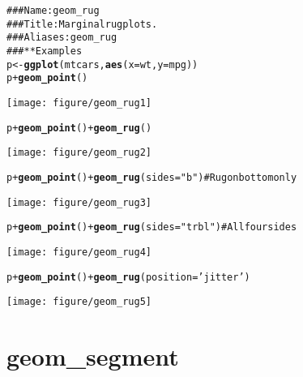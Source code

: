 \documentclass[a4paper,titlepage]{tufte-handout}\usepackage{graphicx, color}
\makeatletter
\def\maxwidth{ %
  \ifdim\Gin@nat@width>\linewidth
    \linewidth
  \else
    \Gin@nat@width
  \fi
}
\newcommand{\hlfunctioncall}[1]{\textcolor[rgb]{0.501960784313725,0,0.329411764705882}{\textbf{#1}}}%
\newcommand{\hlstring}[1]{\textcolor[rgb]{0.6,0.6,1}{#1}}%
\newcommand{\hlcomment}[1]{\textcolor[rgb]{0.180392156862745,0.6,0.341176470588235}{#1}}%
\newenvironment{kframe}{%
 \def\at@end@of@kframe{}%
 \ifinner\ifhmode%
  \def\at@end@of@kframe{\end{minipage}}%
  \begin{minipage}{\columnwidth}%
 \fi\fi%
 \def\FrameCommand##1{\hskip\@totalleftmargin \hskip-\fboxsep
 \colorbox{shadecolor}{##1}\hskip-\fboxsep
     \hskip-\linewidth \hskip-\@totalleftmargin \hskip\columnwidth}%
 \MakeFramed {\advance\hsize-\width
   \@totalleftmargin\z@ \linewidth\hsize
   \@setminipage}}%
 {\par\unskip\endMakeFramed%
 \at@end@of@kframe}
\newenvironment{knitrout}{}{} %
\makeatother
\begin{document}
\begin{knitrout}
\color{fgcolor}\begin{kframe}
\begin{alltt}
\hlcomment{### Name: geom_rug}
\hlcomment{### Title: Marginal rug plots.}
\hlcomment{### Aliases: geom_rug}
\hlcomment{### ** Examples}
p <- \hlfunctioncall{ggplot}(mtcars, \hlfunctioncall{aes}(x=wt, y=mpg))
p + \hlfunctioncall{geom_point}()
\end{alltt}
\end{kframe}\texttt{[image: figure/geom\_rug1]} \begin{kframe}\begin{alltt}
p + \hlfunctioncall{geom_point}() + \hlfunctioncall{geom_rug}()
\end{alltt}
\end{kframe}\texttt{[image: figure/geom\_rug2]} \begin{kframe}\begin{alltt}
p + \hlfunctioncall{geom_point}() + \hlfunctioncall{geom_rug}(sides=\hlstring{"b"})    # Rug on bottom only
\end{alltt}
\end{kframe}\texttt{[image: figure/geom\_rug3]} \begin{kframe}\begin{alltt}
p + \hlfunctioncall{geom_point}() + \hlfunctioncall{geom_rug}(sides=\hlstring{"trbl"}) # All four sides
\end{alltt}
\end{kframe}\texttt{[image: figure/geom\_rug4]} \begin{kframe}\begin{alltt}
p + \hlfunctioncall{geom_point}() + \hlfunctioncall{geom_rug}(position=\hlstring{'jitter'})
\end{alltt}
\end{kframe}\texttt{[image: figure/geom\_rug5]} 
\end{knitrout}


\section{geom\_segment}
\end{document}
